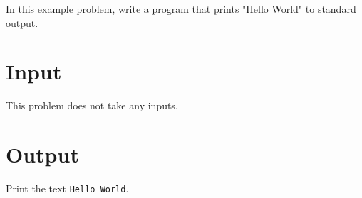 
In this example problem, write a program that prints "Hello World" to standard output.

\section*{Input}
This problem does not take any inputs.

\section*{Output}
Print the text \texttt{Hello World}.